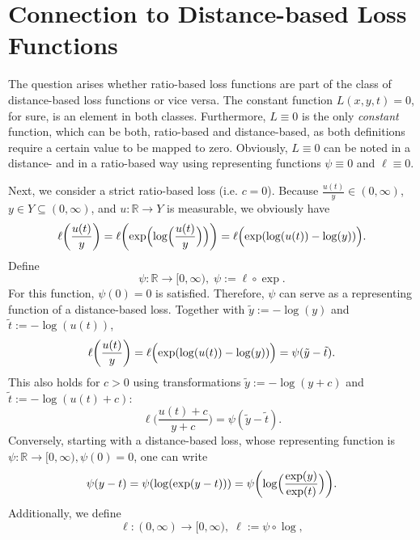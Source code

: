 \documentclass[10pt]{article}
\newcommand{\R}{\mathbb{R}}
\begin{document}
\section{Connection to Distance-based Loss Functions} \label{Kap_Distance}
The question arises whether ratio-based loss functions are part of the class of distance-based loss functions or vice versa.
The constant function $L(x,y,t)=0$, for sure, is an element in both classes.
Furthermore, $L \equiv 0$ is the only \textit{constant} function, which can be both, ratio-based and distance-based, as both definitions require a certain value to be mapped to zero.
Obviously, $L \equiv 0$ can be noted in a distance- and in a ratio-based way using representing functions $\psi \equiv 0$ and $\ell\equiv 0$. 
\par 
Next, we consider a strict ratio-based loss (i.e. $c = 0$).
Because $\frac{u(t)}{y} \in (0, \infty)$, $y \in Y \subseteq (0, \infty)$, and $u: \R \to Y$ is measurable, we obviously have
\begin{equation*}
	\ell\biggl(\frac{u(t)}{y}\biggr) = \ell \biggl(\exp\Bigl(\log\Bigl(\frac{u(t)}{y}\Bigr)\Bigr)\biggr) = \ell\Bigl(\exp(\log(u(t))-\log(y))\Bigl).
\end{equation*}
Define
\begin{equation*}
	\psi: \R \to [0, \infty), \; \psi := \ell \circ \exp.
\end{equation*}
For this function, $\psi(0) = 0$ is satisfied. 
Therefore, $\psi$ can serve as a representing function of a dis\-tance\--based loss.
Together with $\tilde{y} := -\log(y)$ and $\tilde{t} := -\log(u(t))$,
\begin{equation*}
	\ell\biggl(\frac{u(t)}{y}\biggr) = \ell\Bigl(\exp(\log(u(t))-\log(y))\Bigr) = \psi(\tilde{y}-\tilde{t}).
\end{equation*}
This also holds for $c > 0$ using transformations $\tilde{y} := -\log(y+c)$ and $\tilde{t} := -\log(u(t)+c)$:
\begin{equation*}
	\ell\biggl(\frac{u(t)+c}{y+c}\biggr) = \psi(\tilde{y}-\tilde{t}).
\end{equation*}
Conversely, starting with a distance-based loss, whose representing function is $\psi: \R \to [0, \infty), \psi(0) = 0$, one can write
\begin{equation*}
	\psi(y-t) = \psi(\log(\exp(y-t))) = \psi\biggl(\log\Bigl(\frac{\exp(y)}{\exp(t)}\Bigr)\biggr).
\end{equation*}
Additionally, we define 
\begin{equation*}
	\ell: (0, \infty) \to [0, \infty), \; \ell := \psi \circ \log,
\end{equation*}
\end{document}
